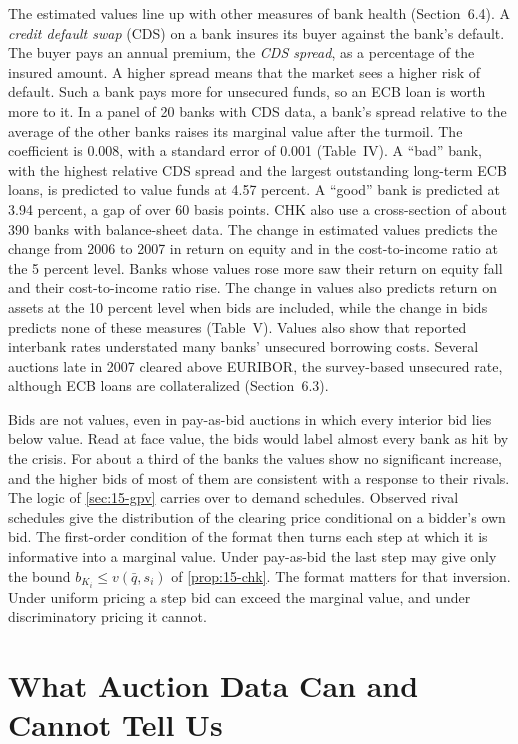 The estimated values line up with other measures of bank health (Section~6.4). A \emph{credit default
swap} (CDS) on a bank insures its buyer against the bank's default. The buyer pays an annual premium, the
\emph{CDS spread}, as a percentage of the insured amount. A higher spread means that the market sees a
higher risk of default. Such a bank pays more for unsecured funds, so an ECB loan is worth more to it. In a
panel of 20 banks with CDS data, a bank's spread relative to the average of the other banks raises its
marginal value after the turmoil. The coefficient is 0.008, with a standard error of 0.001 (Table~IV).
A ``bad'' bank, with the
highest relative CDS spread and the largest outstanding long-term ECB loans, is predicted to value funds at
4.57 percent. A ``good'' bank is predicted at 3.94 percent, a gap of over 60 basis points. CHK also use a
cross-section of about 390 banks with balance-sheet data. The change in estimated values predicts the change
from 2006 to 2007 in return on equity and in the cost-to-income ratio at the 5 percent level. Banks whose
values rose more saw their return on equity fall and their cost-to-income ratio rise. The change in values
also predicts return on assets at the 10 percent level when bids are included, while the change in bids
predicts none of these measures (Table~V). Values also show that reported interbank rates understated many banks'
unsecured borrowing costs. Several auctions late in 2007 cleared above EURIBOR, the survey-based unsecured
rate, although ECB loans are collateralized (Section~6.3).

 Bids are not values, even in pay-as-bid auctions in which every interior bid lies below
value. Read at face value, the bids would label almost every bank as hit by the crisis. For about a third of
the banks the values show no significant increase, and the higher bids of most of them are consistent with a
response to their rivals. The logic of \cref{sec:15-gpv} carries over to demand schedules.
Observed rival schedules give the distribution of the clearing price conditional on a bidder's own bid. The
first-order condition of the format then turns each step at which it is informative into a marginal value.
Under pay-as-bid the last step may give only the bound $b_{K_i}\le v(\bar q,s_i)$ of \cref{prop:15-chk}.
The format matters for that
inversion. Under uniform pricing a step bid can exceed the marginal value, and under discriminatory pricing
it cannot.

\section{What Auction Data Can and Cannot Tell Us}\label{sec:15-synthesis}

